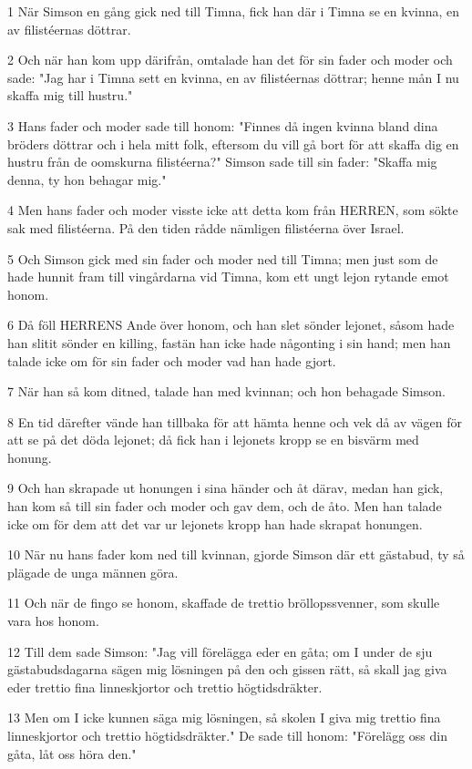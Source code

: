 \par 1 När Simson en gång gick ned till Timna, fick han där i Timna se en kvinna, en av filistéernas döttrar.
\par 2 Och när han kom upp därifrån, omtalade han det för sin fader och moder och sade: "Jag har i Timna sett en kvinna, en av filistéernas döttrar; henne mån I nu skaffa mig till hustru."
\par 3 Hans fader och moder sade till honom: "Finnes då ingen kvinna bland dina bröders döttrar och i hela mitt folk, eftersom du vill gå bort för att skaffa dig en hustru från de oomskurna filistéerna?" Simson sade till sin fader: "Skaffa mig denna, ty hon behagar mig."
\par 4 Men hans fader och moder visste icke att detta kom från HERREN, som sökte sak med filistéerna. På den tiden rådde nämligen filistéerna över Israel.
\par 5 Och Simson gick med sin fader och moder ned till Timna; men just som de hade hunnit fram till vingårdarna vid Timna, kom ett ungt lejon rytande emot honom.
\par 6 Då föll HERRENS Ande över honom, och han slet sönder lejonet, såsom hade han slitit sönder en killing, fastän han icke hade någonting i sin hand; men han talade icke om för sin fader och moder vad han hade gjort.
\par 7 När han så kom ditned, talade han med kvinnan; och hon behagade Simson.
\par 8 En tid därefter vände han tillbaka för att hämta henne och vek då av vägen för att se på det döda lejonet; då fick han i lejonets kropp se en bisvärm med honung.
\par 9 Och han skrapade ut honungen i sina händer och åt därav, medan han gick, han kom så till sin fader och moder och gav dem, och de åto. Men han talade icke om för dem att det var ur lejonets kropp han hade skrapat honungen.
\par 10 När nu hans fader kom ned till kvinnan, gjorde Simson där ett gästabud, ty så plägade de unga männen göra.
\par 11 Och när de fingo se honom, skaffade de trettio bröllopssvenner, som skulle vara hos honom.
\par 12 Till dem sade Simson: "Jag vill förelägga eder en gåta; om I under de sju gästabudsdagarna sägen mig lösningen på den och gissen rätt, så skall jag giva eder trettio fina linneskjortor och trettio högtidsdräkter.
\par 13 Men om I icke kunnen säga mig lösningen, så skolen I giva mig trettio fina linneskjortor och trettio högtidsdräkter." De sade till honom: "Förelägg oss din gåta, låt oss höra den."

